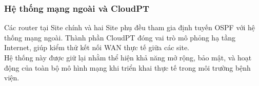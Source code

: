 \subsubsection{Hệ thống mạng ngoài và CloudPT}
Các router tại Site chính và hai Site phụ đều tham gia định tuyến OSPF với hệ
thống mạng ngoài. Thành phần CloudPT đóng vai trò mô phỏng hạ tầng Internet,
giúp kiểm thử kết nối WAN thực tế giữa các site.\\
\indent Hệ thống này được giữ lại nhằm thể hiện khả năng mở rộng, bảo mật, và hoạt động
của toàn bộ mô hình mạng khi triển khai thực tế trong môi trường bệnh viện.


